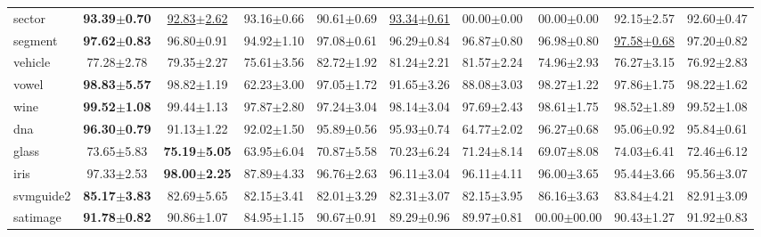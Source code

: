 \documentclass{article}
\begin{document}
\begin{table*}[t]
\begin{tabular*}{\linewidth}{@{\extracolsep{-0.23cm}}lccccccccc}
sector             & \textbf{93.39$\pm$0.70}   &\underline{92.83$\pm$2.62}&93.16$\pm$0.66      &90.61$\pm$0.69            &\underline{93.34$\pm$0.61}                    &00.00$\pm$0.00    &00.00$\pm$0.00             &92.15$\pm$2.57            &92.60$\pm$0.47\\
segment            & \textbf{97.62$\pm$0.83}   &96.80$\pm$0.91            &94.92$\pm$1.10      &97.08$\pm$0.61            &96.29$\pm$0.84       &96.87$\pm$0.80    &96.98$\pm$0.80             &\underline{97.58$\pm$0.68}&97.20$\pm$0.82\\
vehicle            & 77.28$\pm$2.78            &79.35$\pm$2.27            &75.61$\pm$3.56      &82.72$\pm$1.92            &81.24$\pm$2.21       &81.57$\pm$2.24    &74.96$\pm$2.93             &76.27$\pm$3.15            &76.92$\pm$2.83\\
vowel              &\textbf{98.83$\pm$5.57}    &98.82$\pm$1.19            &62.23$\pm$3.00      &97.05$\pm$1.72            &91.65$\pm$3.26       &88.08$\pm$3.03    &98.27$\pm$1.22             &97.86$\pm$1.75            &98.22$\pm$1.62\\
wine               &\textbf{99.52$\pm$1.08}    &99.44$\pm$1.13            &97.87$\pm$2.80      &97.24$\pm$3.04            &98.14$\pm$3.04       &97.69$\pm$2.43    &98.61$\pm$1.75             &98.52$\pm$1.89            &99.52$\pm$1.08            \\
dna                &\textbf{96.30$\pm$0.79}    &91.13$\pm$1.22            &92.02$\pm$1.50      &95.89$\pm$0.56            &95.93$\pm$0.74       &64.77$\pm$2.02    &96.27$\pm$0.68             &95.06$\pm$0.92            &95.84$\pm$0.61\\
glass              & 73.65$\pm$5.83            &\textbf{75.19$\pm$5.05}   &63.95$\pm$6.04      &70.87$\pm$5.58            &70.23$\pm$6.24       &71.24$\pm$8.14    &69.07$\pm$8.08             &74.03$\pm$6.41            &72.46$\pm$6.12\\
iris               &97.33$\pm$2.53             &\textbf{98.00$\pm$2.25}            &87.89$\pm$4.33      &96.76$\pm$2.63            &96.11$\pm$3.04    &96.11$\pm$4.11    &96.00$\pm$3.65             &95.44$\pm$3.66            &95.56$\pm$3.07\\
svmguide2          &\textbf{85.17$\pm$3.83}    &82.69$\pm$5.65            &82.15$\pm$3.41      &82.01$\pm$3.29            &82.31$\pm$3.07       &82.15$\pm$3.95    &86.16$\pm$3.63             &83.84$\pm$4.21            &82.91$\pm$3.09\\
satimage           &\textbf{91.78$\pm$0.82}    &90.86$\pm$1.07            &84.95$\pm$1.15      &90.67$\pm$0.91            &89.29$\pm$0.96       &89.97$\pm$0.81    &00.00$\pm$00.00            &90.43$\pm$1.27            &91.92$\pm$0.83\\
\bottomrule
\end{tabular*}
\vspace{-0.3cm}
\end{table*}
\end{document}
